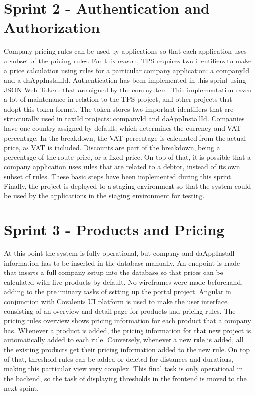 %
\section{Sprint 2 - Authentication and Authorization}
Company pricing rules can be used by applications so that each application uses a subset of the pricing rules. For this reason, TPS requires two identifiers to make a price calculation using rules for a particular company application: a companyId and a daAppInstallId. Authentication has been implemented in this sprint using JSON Web Tokens that are signed by the core system. This implementation saves a lot of maintenance in relation to the TPS project, and other projects that adopt this token format. The token stores two important identifiers that are structurally used in taxiId projects: companyId and daAppInstallId. Companies have one country assigned by default, which determines the currency and VAT percentage. In the breakdown, the VAT percentage is calculated from the actual price, as VAT is included. Discounts are part of the breakdown, being a percentage of the route price, or a fixed price. On top of that, it is possible that a company application uses rules that are related to a debtor, instead of its own subset of rules. These basic steps have been implemented during this sprint. Finally, the project is deployed to a staging environment so that the system could be used by the applications in the staging environment for testing.

%
\section{Sprint 3 - Products and Pricing}
At this point the system is fully operational, but company and daAppInstall information has to be inserted in the database manually. An endpoint is made that inserts a full company setup into the database so that prices can be calculated with five products by default. No wireframes were made beforehand, adding to the preliminary tasks of setting up the portal project. Angular in conjunction with Covalents UI platform is used to make the user interface, consisting of an overview and detail page for products and pricing rules. The pricing rules overview shows pricing information for each product that a company has. Whenever a product is added, the pricing information for that new project is automatically added to each rule. Conversely, whenever a new rule is added, all the existing products get their pricing information added to the new rule. On top of that, threshold rules can be added or deleted for distances and durations, making this particular view very complex. This final task is only operational in the backend, so the task of displaying thresholds in the frontend is moved to the next sprint.

